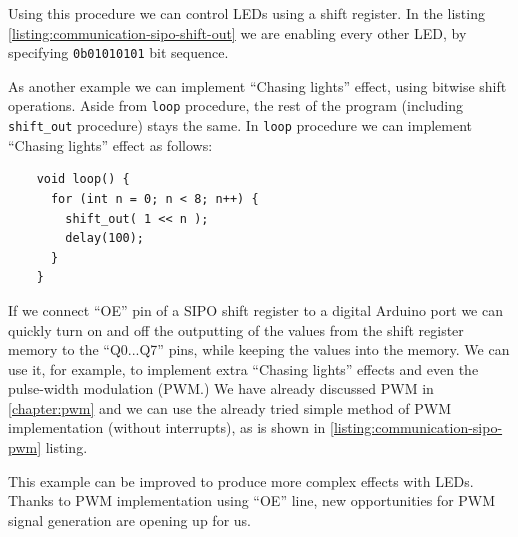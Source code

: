 \documentclass[../sparc.tex]{subfiles}
\begin{document}
Using this procedure we can control LEDs using a shift register.  In the listing
\ref{listing:communication-sipo-shift-out} we are enabling every other LED, by
specifying \texttt{0b01010101} bit sequence.

As another example we can implement ``Chasing lights'' effect, using bitwise
shift operations.  Aside from \texttt{loop} procedure, the rest of the
program (including \texttt{shift_out} procedure) stays the same.  In
\texttt{loop} procedure we can implement ``Chasing lights'' effect as
follows:

\begin{listing}[H]
  \begin{verbatim}
    void loop() {
      for (int n = 0; n < 8; n++) {
        shift_out( 1 << n );
        delay(100);
      }
    }
  \end{verbatim}
  \label{listing:communication-sipo-chasing-lights}
  \caption{Implementation of ``Chasing lights'' effect on a shift register.}
\end{listing}

If we connect ``OE'' pin of a SIPO shift register to a digital Arduino port we
can quickly turn on and off the outputting of the values from the shift register
memory to the ``Q0...Q7'' pins, while keeping the values into the memory.  We
can use it, for example, to implement extra ``Chasing lights'' effects and even
the pulse-width modulation (PWM.)  We have already discussed PWM in
\ref{chapter:pwm} and we can use the already tried simple method of PWM
implementation (without interrupts), as is shown in
\ref{listing:communication-sipo-pwm} listing.

This example can be improved to produce more complex effects with LEDs.  Thanks
to PWM implementation using ``OE'' line, new opportunities for PWM signal
generation are opening up for us.
\end{document}
